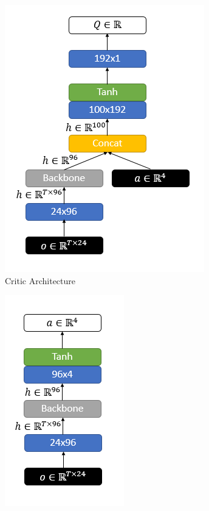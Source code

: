 \documentclass[a4paper, 12pt]{article} %
\begin{document}
\begin{figure}
	\centering
	\begin{subfigure}{.35\textwidth}
		\centering
		\includegraphics[width=0.9\linewidth]{figures/nets/critic.png}
		\caption{Critic Architecture}
		\label{fig:critic_net}
	\end{subfigure}
	\begin{subfigure}{.35\textwidth}
		\centering
		\includegraphics[width=0.6\linewidth]{figures/nets/actor.png}

\end{subfigure}
\end{figure}
\end{document}
